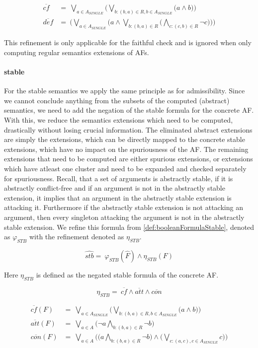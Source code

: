 \begin{align*}
    \overline{cf}&=\ \bigvee_{a \in A_{\!S\!I\!N\!G\!L\!E}} \big( \bigvee_{b:(b,a)\in R, b \in A_{\!S\!I\!N\!G\!L\!E}} \big( a \land b \big) \big)\\
    \overline{def}&=\ \big( \bigvee_{a \in A_{\!S\!I\!N\!G\!L\!E}}\big( a \land \bigvee_{b:(b,a)\in R} \big( \bigwedge_{c:(c, b)\in R} \lnot c\big)\big) \big)
\end{align*}

This refinement is only applicable for the faithful check and is ignored when only computing regular semantics extensions of AFs.

\paragraph{stable} For the stable semantics we apply the same principle as for admissibility. Since we cannot conclude anything from the subsets of the computed (abstract) semantics, we need to add the negation of the stable formula for the concrete AF. With this, we reduce the semantics extensions which need to be computed, drastically without losing crucial information. The eliminated abstract extensions are simply the extensions, which can be directly mapped to the concrete stable extensions, which have no impact on the spuriousness of the AF. The remaining extensions that need to be computed are either spurious extensions, or extensions which have atleast one cluster and need to be expanded and checked separately for spuriousness. Recall, that a set of
arguments is abstractly stable, if it is abstractly conflict-free and if an argument is not in the abstractly stable extension, it implies that an argument in the abstractly stable extension is attacking it. Furthermore if the abstractly stable extension is not attacking an argument, then every singleton attacking the argument is not in the abstractly stable extension. We refine this formula from \cref{def:booleanFormulaStable}, denoted as $\varphi_{\!S\!T\!B}$ with the refinement denoted as $\eta_{S\!T\!B}$.


\vspace{0.2cm}
$$ \hat{stb}=\  \varphi_{\!S\!T\!B}(\hat{F}) \land \eta_{S\!T\!B}(F) $$
\vspace{0.1cm}

Here $\eta_{S\!T\!B}$ is defined as the negated stable formula of the concrete AF.

\vspace{0.2cm}

$$
\eta_{S\!T\!B} =\ \overline{cf} \land \overline{att} \land \overline{con}
$$

\begin{align*}
    \overline{cf}(F)&=\ \bigvee_{a \in A_{\!S\!I\!N\!G\!L\!E}} \big( \bigvee_{b:(b,a)\in R, b \in A_{\!S\!I\!N\!G\!L\!E}} \big( a \land b \big) \big)\\
    \overline{att}(F)&=\ \bigvee_{a \in A} \big( \lnot a \bigwedge_{b:(b,a)\in R} \lnot b \big)\\
    \overline{con}(F)&=\ \bigvee_{a \in A} \big( \big( a \bigwedge_{b:(b,a)\in R} \lnot b) \land \big(\bigvee_{c:(a,c), c\in A_{\!S\!I\!N\!G\!L\!E}} c\big) \big)
\end{align*}
